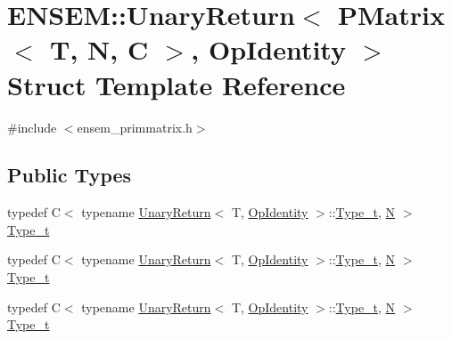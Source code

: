 \hypertarget{structENSEM_1_1UnaryReturn_3_01PMatrix_3_01T_00_01N_00_01C_01_4_00_01OpIdentity_01_4}{}\section{E\+N\+S\+EM\+:\+:Unary\+Return$<$ P\+Matrix$<$ T, N, C $>$, Op\+Identity $>$ Struct Template Reference}
\label{structENSEM_1_1UnaryReturn_3_01PMatrix_3_01T_00_01N_00_01C_01_4_00_01OpIdentity_01_4}


{\ttfamily \#include $<$ensem\+\_\+primmatrix.\+h$>$}

\subsection*{Public Types}
\begin{DoxyCompactItemize}
\item 
typedef C$<$ typename \mbox{\hyperlink{structENSEM_1_1UnaryReturn}{Unary\+Return}}$<$ T, \mbox{\hyperlink{structENSEM_1_1OpIdentity}{Op\+Identity}} $>$\+::\mbox{\hyperlink{structENSEM_1_1UnaryReturn_3_01PMatrix_3_01T_00_01N_00_01C_01_4_00_01OpIdentity_01_4_aefea410b4798e392c030f78deb3ceb20}{Type\+\_\+t}}, \mbox{\hyperlink{adat__devel_2lib_2hadron_2operator__name__util_8cc_a7722c8ecbb62d99aee7ce68b1752f337}{N}} $>$ \mbox{\hyperlink{structENSEM_1_1UnaryReturn_3_01PMatrix_3_01T_00_01N_00_01C_01_4_00_01OpIdentity_01_4_aefea410b4798e392c030f78deb3ceb20}{Type\+\_\+t}}
\item 
typedef C$<$ typename \mbox{\hyperlink{structENSEM_1_1UnaryReturn}{Unary\+Return}}$<$ T, \mbox{\hyperlink{structENSEM_1_1OpIdentity}{Op\+Identity}} $>$\+::\mbox{\hyperlink{structENSEM_1_1UnaryReturn_3_01PMatrix_3_01T_00_01N_00_01C_01_4_00_01OpIdentity_01_4_aefea410b4798e392c030f78deb3ceb20}{Type\+\_\+t}}, \mbox{\hyperlink{adat__devel_2lib_2hadron_2operator__name__util_8cc_a7722c8ecbb62d99aee7ce68b1752f337}{N}} $>$ \mbox{\hyperlink{structENSEM_1_1UnaryReturn_3_01PMatrix_3_01T_00_01N_00_01C_01_4_00_01OpIdentity_01_4_aefea410b4798e392c030f78deb3ceb20}{Type\+\_\+t}}
\item 
typedef C$<$ typename \mbox{\hyperlink{structENSEM_1_1UnaryReturn}{Unary\+Return}}$<$ T, \mbox{\hyperlink{structENSEM_1_1OpIdentity}{Op\+Identity}} $>$\+::\mbox{\hyperlink{structENSEM_1_1UnaryReturn_3_01PMatrix_3_01T_00_01N_00_01C_01_4_00_01OpIdentity_01_4_aefea410b4798e392c030f78deb3ceb20}{Type\+\_\+t}}, \mbox{\hyperlink{adat__devel_2lib_2hadron_2operator__name__util_8cc_a7722c8ecbb62d99aee7ce68b1752f337}{N}} $>$ \mbox{\hyperlink{structENSEM_1_1UnaryReturn_3_01PMatrix_3_01T_00_01N_00_01C_01_4_00_01OpIdentity_01_4_aefea410b4798e392c030f78deb3ceb20}{Type\+\_\+t}}
\end{DoxyCompactItemize}


